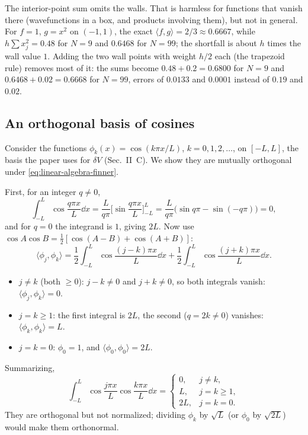 \begin{pitfall}
The interior-point sum omits the walls. That is harmless for functions that vanish there (wavefunctions in a box, and products involving them), but not in general. For $f=1$, $g=x^2$ on $(-1,1)$, the exact $\langle f,g\rangle=2/3\approx0.6667$, while $h\sum x_j^2=0.48$ for $N=9$ and $0.6468$ for $N=99$; the shortfall is about $h$ times the wall value $1$. Adding the two wall points with weight $h/2$ each (the trapezoid rule) removes most of it: the sums become $0.48+0.2=0.6800$ for $N=9$ and $0.6468+0.02=0.6668$ for $N=99$, errors of $0.0133$ and $0.0001$ instead of $0.19$ and $0.02$.
\end{pitfall}

\subsection{An orthogonal basis of cosines}

Consider the functions $\phi_k(x)=\cos(k\pi x/L)$, $k=0,1,2,\dots$, on $[-L,L]$, the basis the paper uses for $\delta V$ (Sec.~II~C). We show they are mutually orthogonal under \cref{eq:linear-algebra-finner}.

First, for an integer $q\ne0$,
\[
\int_{-L}^{L}\cos\frac{q\pi x}{L}\dd x=\frac{L}{q\pi}\Big[\sin\frac{q\pi x}{L}\Big]_{-L}^{L}=\frac{L}{q\pi}\big(\sin q\pi-\sin(-q\pi)\big)=0,
\]
and for $q=0$ the integrand is $1$, giving $2L$. Now use $\cos A\cos B=\tfrac12[\cos(A-B)+\cos(A+B)]$:
\begin{equation}
\langle\phi_j,\phi_k\rangle=\frac12\int_{-L}^{L}\cos\frac{(j-k)\pi x}{L}\dd x+\frac12\int_{-L}^{L}\cos\frac{(j+k)\pi x}{L}\dd x .
\label{eq:linear-algebra-cosprod}
\end{equation}
\begin{itemize}
\item $j\ne k$ (both $\ge0$): $j-k\ne0$ and $j+k\ne0$, so both integrals vanish: $\langle\phi_j,\phi_k\rangle=0$.
\item $j=k\ge1$: the first integral is $2L$, the second ($q=2k\ne0$) vanishes: $\langle\phi_k,\phi_k\rangle=L$.
\item $j=k=0$: $\phi_0=1$, and $\langle\phi_0,\phi_0\rangle=2L$.
\end{itemize}
Summarizing,
\begin{equation}
\int_{-L}^{L}\cos\frac{j\pi x}{L}\cos\frac{k\pi x}{L}\dd x=\begin{cases}0,&j\ne k,\\ L,&j=k\ge1,\\ 2L,&j=k=0.\end{cases}
\label{eq:linear-algebra-cosorth}
\end{equation}
They are orthogonal but not normalized; dividing $\phi_k$ by $\sqrt L$ (or $\phi_0$ by $\sqrt{2L}$) would make them orthonormal.

